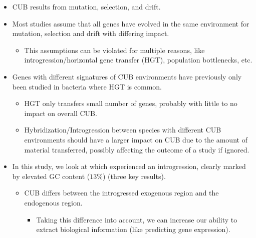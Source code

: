 \documentclass[12pt]{article}
\begin{document}
\begin{itemize}
	\item CUB results from mutation, selection, and drift.
	\item Most studies assume that all genes have evolved in the same environment for mutation, selection and drift with differing impact.
	\begin{itemize}
		\item This assumptions can be violated for multiple reasons, like introgression/horizontal gene transfer (HGT), population bottlenecks, etc.
	\end{itemize}
	 \item Genes with different signatures of CUB environments have previously only been studied in bacteria where HGT is common.
	\begin{itemize}
		\item HGT only transfers small number of genes, probably with little to no impact on overall CUB.
		\item Hybridization/Introgression between species with different CUB environments should have a larger impact on CUB due to the amount of material transferred, possibly affecting the outcome of a study if ignored. 
	\end{itemize}
	\item In this study, we look at \kluyveri which experienced an introgression, clearly marked by elevated GC content ($13 \%$) (three key results).
	\begin{itemize}
		\item CUB differs between the introgressed exogenous region and the endogenous region.
		\begin{itemize}
			\item Taking this difference into account, we can increase our ability to extract biological information (like predicting gene expression).

\end{itemize}
\end{itemize}
\end{itemize}
\end{document}

